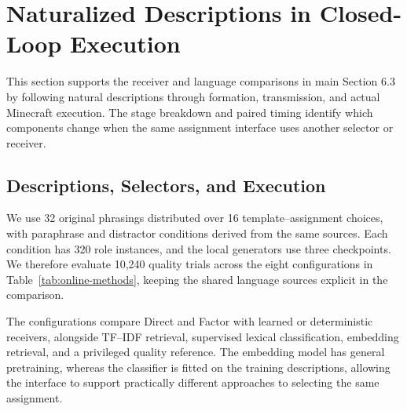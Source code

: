 \documentclass[sigconf,nonacm,balance=false]{aamas}
\begin{document}
\section{Naturalized Descriptions in Closed-Loop Execution}
\label{sec:supp-online-descriptions}

This section supports the receiver and language comparisons in main Section 6.3 by following natural descriptions through formation, transmission, and actual Minecraft execution. The stage breakdown and paired timing identify which components change when the same assignment interface uses another selector or receiver.

\subsection{Descriptions, Selectors, and Execution}

We use 32 original phrasings distributed over 16 template--assignment choices, with paraphrase and distractor conditions derived from the same sources. Each condition has 320 role instances, and the local generators use three checkpoints. We therefore evaluate 10,240 quality trials across the eight configurations in Table~\ref{tab:online-methods}, keeping the shared language sources explicit in the comparison.

The configurations compare Direct and Factor with learned or deterministic receivers, alongside TF--IDF retrieval, supervised lexical classification, embedding retrieval, and a privileged quality reference. The embedding model has general pretraining, whereas the classifier is fitted on the training descriptions, allowing the interface to support practically different approaches to selecting the same assignment.
\end{document}

